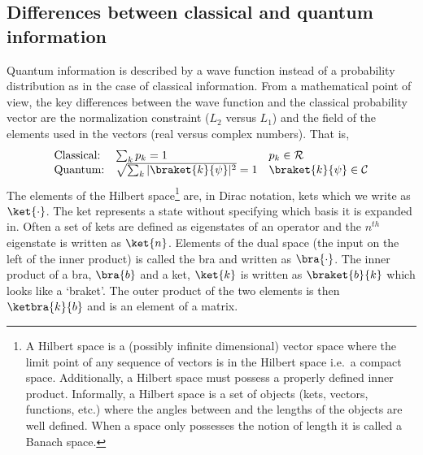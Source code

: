\documentclass[11pt,oneside,final]{huthesis}%
\begin{document}
\subsection{Differences between classical and quantum information}
Quantum information is described by a wave function instead of 
a probability distribution as in the case of classical information.   From a mathematical point of view, the key differences between the wave function and the classical probability vector are the normalization constraint ($L_2$ versus $L_1$) and the field of the elements used in the vectors (real versus complex numbers). That is,
\[
\begin{array}{lll}
	\textrm{Classical:} & \sum_k p_k=1 & p_k\in \mathcal{R}\\
	\textrm{Quantum:} &\sqrt{ \sum_k |\braket{k}{\psi}|^2}=1 & \braket{k}{\psi}\in \mathcal{C}
\end{array}
\]
The elements of the Hilbert space\footnote{A Hilbert space is a (possibly infinite dimensional) vector space where the limit point of any sequence of vectors is in the Hilbert space i.e.~a compact space.  Additionally, a Hilbert space must possess a properly defined inner product.  Informally, a Hilbert space is a set of objects (kets, vectors, functions, etc.) where the angles between and the lengths of the objects are well defined.  When a space only possesses the notion of length it is called a Banach space. } are, in Dirac notation, kets which we write as $\ket{\cdot}$.  The ket represents a state without specifying which basis it is expanded in.  Often a set of kets are defined as eigenstates of an operator and the $n^{th}$ eigenstate is written as $\ket{n}$.   Elements of the dual space (the input on the left of the inner product) is called the bra and written as $\bra{\cdot}$.  The inner product of a bra, $\bra{b}$ and a ket, $\ket{k}$ is written as $\braket{b}{k}$ which looks like a `braket'.  The outer product of the two elements is then $\ketbra{k}{b}$ and is an element of a matrix.
\end{document}
